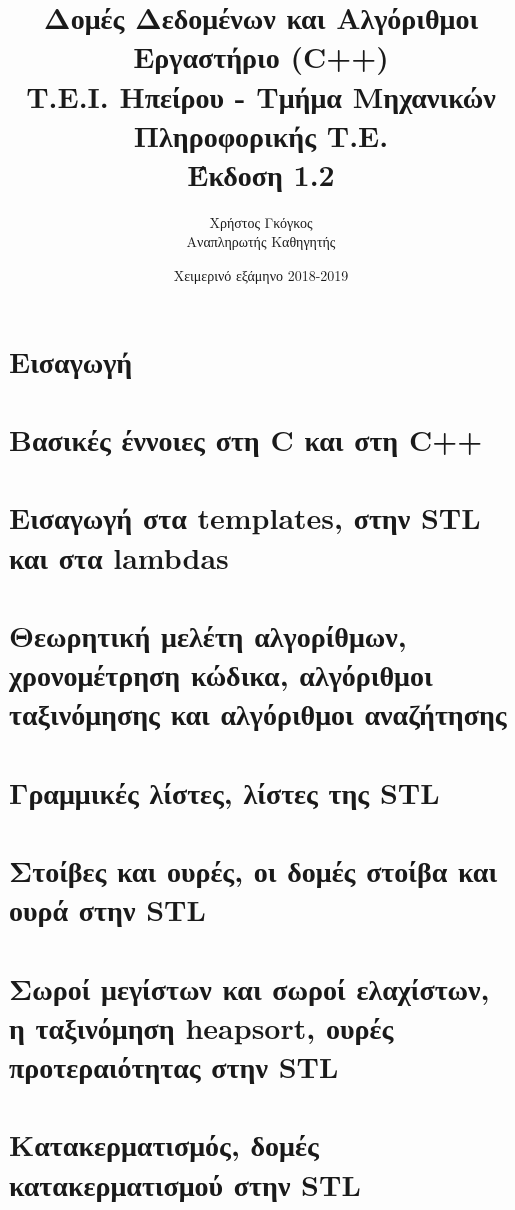 \documentclass[11pt,a4paper,twoside,openany]{book}
\title{Δομές Δεδομένων και Αλγόριθμοι \\ Εργαστήριο (C++)\\ Τ.Ε.Ι. Ηπείρου - Τμήμα Μηχανικών Πληροφορικής Τ.Ε. \\ Έκδοση 1.2}
\author{Χρήστος Γκόγκος  \\ Αναπληρωτής Καθηγητής }
\date{Χειμερινό εξάμηνο 2018-2019}
\begin{document}
\frontmatter
\maketitle
\tableofcontents
\mainmatter

\chapter*{Εισαγωγή}


\chapter{Βασικές έννοιες στη C και στη C++}


\chapter{Εισαγωγή στα templates, στην STL και στα lambdas}


\chapter{Θεωρητική μελέτη αλγορίθμων, χρονομέτρηση κώδικα, αλγόριθμοι ταξινόμησης και αλγόριθμοι αναζήτησης}


\chapter{Γραμμικές λίστες, λίστες της STL}


\chapter{Στοίβες και ουρές, οι δομές στοίβα και ουρά στην STL}


\chapter{Σωροί μεγίστων και σωροί ελαχίστων, η ταξινόμηση heapsort, ουρές προτεραιότητας στην STL}


\chapter{Κατακερματισμός, δομές κατακερματισμού στην STL}

\end{document}
